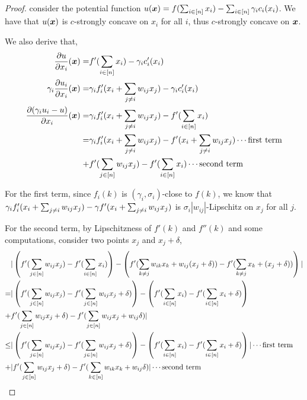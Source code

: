\begin{proof}
\label{prf:thm:NE:unique:near-potential}
consider the potential function $u({\bm{x}}) = f(\sum_{i\in[n]} x_i) - \sum_{i\in[n]} \gamma_i c_i(x_i)$. We have that $u({\bm{x}})$ is $c$-strongly concave on $x_i$ for all $i$, thus $c$-strongly concave on ${\bm{x}}$.

We also derive that,
\begin{align*}
    \frac{\partial u}{\partial x_i}({\bm{x}}) =& f'(\sum_{i\in[n]} x_i) - \gamma_i c_i'(x_i)
    \\
    \gamma_i \frac{\partial u_i}{\partial x_i}({\bm{x}}) =& \gamma_i f'_i(x_i + \sum_{j\ne i} w_{ij} x_j) - \gamma_i c'_i(x_i)
    \\
    \frac{\partial (\gamma_i u_i - u)}{\partial x_i}({\bm{x}}) =& \gamma_i f'_i(x_i + \sum_{j\ne i} w_{ij} x_j) - f'(\sum_{i\in[n]} x_i)
    \\
    =& \gamma_i f'_i(x_i + \sum_{j\ne i} w_{ij} x_j) - f'(x_i + \sum_{j\ne i} w_{ij} x_j)\cdots \text{first term}
    \\
    +& f'(\sum_{j\in[n]} w_{ij} x_j) - f'(\sum_{i\in[n]} x_i)\cdots \text{second term}
\end{align*}

For the first term, since $f_i(k)$ is $(\gamma_i, \sigma_i)$-close to $f(k)$, we know that 
$\gamma_i f'_i(x_i + \sum_{j\ne i} w_{ij} x_j) - \gamma f'(x_i + \sum_{j\ne i} w_{ij} x_j)$ 
is $\sigma_i |w_{ij}|$-Lipschitz on $x_j$ for all $j$.

For the second term, by Lipschitzness of $f'(k)$ and $f''(k)$ and some computations, consider two points $x_j$ and $x_j + \delta$,
\begin{align*}
    & | \left(f'(\sum_{j\in[n]} w_{ij} x_j) - f'(\sum_{i\in[n]} x_i)\right) - \left(f'(\sum_{k\ne j} w_{ik} x_k + w_{ij}(x_j + \delta)) - f'(\sum_{k\ne j} x_k + (x_j + \delta))\right) |
    \\
    =& | \left(f'(\sum_{j\in[n]} w_{ij} x_j) - f'(\sum_{j\in[n]} w_{ij} x_j + \delta)\right) - \left( f'(\sum_{i\in[n]} x_i) - f'(\sum_{i\in[n]} x_i + \delta)\right)
    \\
    +& f'(\sum_{j\in[n]} w_{ij} x_j + \delta) - f'(\sum_{j\in[n]} w_{ij} x_j + w_{ij}\delta) |
    \\
    \le& | \left(f'(\sum_{j\in[n]} w_{ij} x_j) - f'(\sum_{j\in[n]} w_{ij} x_j + \delta)\right) - \left( f'(\sum_{i\in[n]} x_i) - f'(\sum_{i\in[n]} x_i + \delta)\right) |\cdots\text{first term}
    \\
    +& | f'(\sum_{j\in[n]} w_{ij} x_j + \delta) - f'(\sum_{k\in[n]} w_{ik} x_k + w_{ij}\delta) |\cdots\text{second term}
    \\
\end{align*}


\end{proof}
